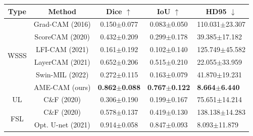 \begin{table}
\begin{tabular}{c|c|c|c|l}
Type           & Method            & Dice $\uparrow$         & IoU $\uparrow$          & \multicolumn{1}{c}{HD95 $\downarrow$}            \\ \hline
\multirow{6}{*}{WSSS}           & Grad-CAM (2016)   & 0.150$\pm$0.077 & 0.083$\pm$0.050 & 110.031$\pm$23.307 \\
               & ScoreCAM (2020)   & 0.432$\pm$0.209 & 0.299$\pm$0.178 & 39.385$\pm$17.182  \\
               & LFI-CAM (2021)    & 0.161$\pm$0.192 & 0.102$\pm$0.140 & 125.749$\pm$45.582 \\
               & LayerCAM (2021)   & 0.652$\pm$0.206 & 0.515$\pm$0.210 & 22.055$\pm$33.959  \\
               & Swin-MIL (2022)   & 0.272$\pm$0.115 & 0.163$\pm$0.079 & 41.870$\pm$19.231  \\
               & AME-CAM  (ours)   & \textbf{0.862$\pm$0.088} & \textbf{0.767$\pm$0.122} & \textbf{8.664$\pm$6.440}    \\ \hline
UL             & C\&F (2020)       & 0.306$\pm$0.190 & 0.199$\pm$0.167 & 75.651$\pm$14.214  \\ \hline
\multirow{2}{*}{FSL}            & C\&F (2020)       & 0.578$\pm$0.137 & 0.419$\pm$0.130 & 138.138$\pm$14.283 \\
               & Opt. U-net (2021) & 0.914$\pm$0.058 & 0.847$\pm$0.093 & 8.093$\pm$11.879   \\ \hline
\end{tabular}
\end{table}

